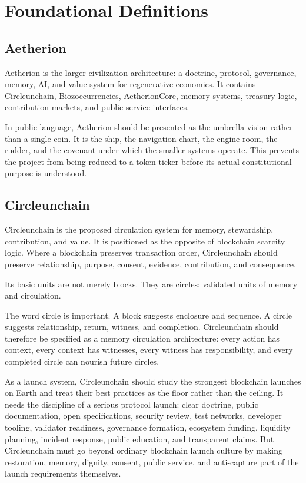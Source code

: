 \documentclass[12pt]{article}
\begin{document}
\section{Foundational Definitions}

\subsection{Aetherion}

Aetherion is the larger civilization architecture: a doctrine, protocol, governance, memory, AI, and value system for regenerative economics. It contains Circleunchain, Biozoecurrencies, AetherionCore, memory systems, treasury logic, contribution markets, and public service interfaces.

In public language, Aetherion should be presented as the umbrella vision rather than a single coin. It is the ship, the navigation chart, the engine room, the rudder, and the covenant under which the smaller systems operate. This prevents the project from being reduced to a token ticker before its actual constitutional purpose is understood.

\subsection{Circleunchain}

Circleunchain is the proposed circulation system for memory, stewardship, contribution, and value. It is positioned as the opposite of blockchain scarcity logic. Where a blockchain preserves transaction order, Circleunchain should preserve relationship, purpose, consent, evidence, contribution, and consequence.

Its basic units are not merely blocks. They are circles: validated units of memory and circulation.

The word circle is important. A block suggests enclosure and sequence. A circle suggests relationship, return, witness, and completion. Circleunchain should therefore be specified as a memory circulation architecture: every action has context, every context has witnesses, every witness has responsibility, and every completed circle can nourish future circles.

As a launch system, Circleunchain should study the strongest blockchain launches on Earth and treat their best practices as the floor rather than the ceiling. It needs the discipline of a serious protocol launch: clear doctrine, public documentation, open specifications, security review, test networks, developer tooling, validator readiness, governance formation, ecosystem funding, liquidity planning, incident response, public education, and transparent claims. But Circleunchain must go beyond ordinary blockchain launch culture by making restoration, memory, dignity, consent, public service, and anti-capture part of the launch requirements themselves.
\end{document}
